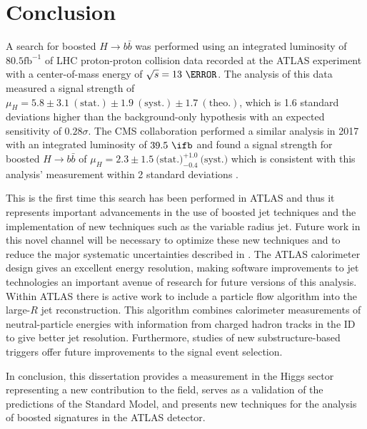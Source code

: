 \chapter{Conclusion} \label{chap:conclusion}

A search for boosted $H \rightarrow b\bar{b}$ was performed using an integrated
luminosity of $80.5 \text{fb}^{-1}$ of LHC proton-proton collision data
recorded at the ATLAS experiment with a center-of-mass energy of $\sqrt{s} =
13~\TeV$. The analysis of this data measured a signal strength of $\mu_{H} =
5.8 \pm 3.1~\mathrm{(stat.)} \pm 1.9~\mathrm{(syst.)} \pm
1.7~\mathrm{(theo.)}$, which is 1.6 standard deviations higher than the
background-only hypothesis with an expected sensitivity of $0.28\sigma$.  The
CMS collaboration performed a similar analysis in 2017 with an integrated
luminosity of $39.5~\ifb$ and found a signal strength for boosted $H
\rightarrow b\bar{b}$ of $\mu_{H} = 2.3 \pm
1.5~\text{(stat.)}_{-0.4}^{+1.0}~\text{(syst.)}$ which is consistent with this
analysis' measurement within 2 standard deviations \cite{Sirunyan:2017dgc}.

This is the first time this search has been performed in ATLAS and thus it
represents important advancements in the use of boosted jet techniques and the
implementation of new techniques such as the variable radius jet.  Future work
in this novel channel will be necessary to optimize these new techniques and to
reduce the major systematic uncertainties described in .  The ATLAS
calorimeter design gives an excellent energy resolution,
making software improvements to jet technologies an important avenue of
research for future versions of this analysis. Within ATLAS there is active
work to include a  particle flow algorithm into the large-$R$ jet
reconstruction. This algorithm combines calorimeter measurements of
neutral-particle energies with information from charged hadron tracks in the ID
to give better jet resolution.  Furthermore, studies of new substructure-based
triggers offer future improvements to the signal event selection.

In conclusion, this dissertation provides a measurement in the Higgs sector
representing a new contribution to the field, serves as a validation of the
predictions of the Standard Model, and presents new techniques for the analysis
of boosted signatures in the ATLAS detector.

